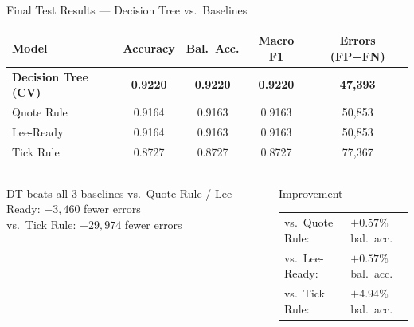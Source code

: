 \documentclass[aspectratio=169,10pt]{beamer}
\begin{document}
\begin{frame}{Final Test Results — Decision Tree vs.\ Baselines}
  \begin{center}
  \begin{tabular}{lcccc}
    \toprule
    \textbf{Model} & \textbf{Accuracy} & \textbf{Bal.\ Acc.} & \textbf{Macro F1} & \textbf{Errors (FP+FN)} \\
    \midrule
    \rowcolor{winrow}
    \textbf{Decision Tree (CV)} & \textbf{0.9220} & \textbf{0.9220} & \textbf{0.9220} & \textbf{47{,}393} \\
    Quote Rule & 0.9164 & 0.9163 & 0.9163 & 50{,}853 \\
    Lee-Ready  & 0.9164 & 0.9163 & 0.9163 & 50{,}853 \\
    Tick Rule  & 0.8727 & 0.8727 & 0.8727 & 77{,}367 \\
    \bottomrule
  \end{tabular}
  \end{center}

  \medskip
  \begin{columns}
    \begin{alertblock}{DT beats all 3 baselines}
      vs.\ Quote Rule / Lee-Ready: $-3{,}460$ fewer errors\\
      vs.\ Tick Rule: $-29{,}974$ fewer errors
    \end{alertblock}

    \begin{exampleblock}{Improvement}
      \begin{tabular}{ll}
        vs.\ Quote Rule: & $+0.57\%$ bal.\ acc. \\
        vs.\ Lee-Ready:  & $+0.57\%$ bal.\ acc. \\
        vs.\ Tick Rule:  & $+4.94\%$ bal.\ acc. \\
      \end{tabular}
    \end{exampleblock}
  \end{columns}
\end{frame}
\end{document}
